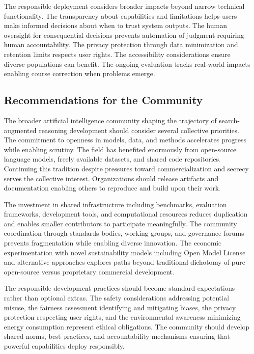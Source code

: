 The responsible deployment considers broader impacts beyond narrow technical functionality. The transparency about capabilities and limitations helps users make informed decisions about when to trust system outputs. The human oversight for consequential decisions prevents automation of judgment requiring human accountability. The privacy protection through data minimization and retention limits respects user rights. The accessibility considerations ensure diverse populations can benefit. The ongoing evaluation tracks real-world impacts enabling course correction when problems emerge.

\subsection{Recommendations for the Community}

The broader artificial intelligence community shaping the trajectory of search-augmented reasoning development should consider several collective priorities. The commitment to openness in models, data, and methods accelerates progress while enabling scrutiny. The field has benefited enormously from open-source language models, freely available datasets, and shared code repositories. Continuing this tradition despite pressures toward commercialization and secrecy serves the collective interest. Organizations should release artifacts and documentation enabling others to reproduce and build upon their work.

The investment in shared infrastructure including benchmarks, evaluation frameworks, development tools, and computational resources reduces duplication and enables smaller contributors to participate meaningfully. The community coordination through standards bodies, working groups, and governance forums prevents fragmentation while enabling diverse innovation. The economic experimentation with novel sustainability models including Open Model License and alternative approaches explores paths beyond traditional dichotomy of pure open-source versus proprietary commercial development.

The responsible development practices should become standard expectations rather than optional extras. The safety considerations addressing potential misuse, the fairness assessment identifying and mitigating biases, the privacy protection respecting user rights, and the environmental awareness minimizing energy consumption represent ethical obligations. The community should develop shared norms, best practices, and accountability mechanisms ensuring that powerful capabilities deploy responsibly.

